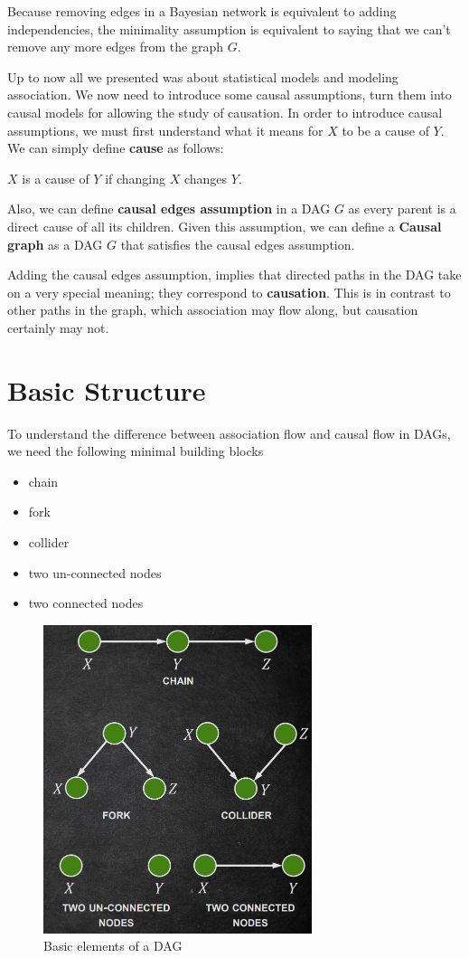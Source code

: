 Because removing edges in a Bayesian network is equivalent to adding
independencies, the minimality assumption is equivalent to saying that we can't
remove any more edges from the graph $G$.

Up to now all we presented was about statistical models and modeling association.
We now need to introduce some causal assumptions, turn them into causal models
for allowing the study of causation. In order to introduce causal assumptions,
we must first understand what it means for $X$ to be a cause of $Y$. We can simply
define \textbf{cause} as follows:
\begin{definition}
    $X$ is a cause of $Y$ if changing $X$ changes $Y$.
\end{definition}

Also, we can define \textbf{causal edges assumption} in a DAG $G$ as every parent
is a direct cause of all its children. Given this assumption, we can define a
\textbf{Causal graph} as a DAG $G$ that satisfies the causal edges assumption.

Adding the causal edges assumption, implies that directed paths in the DAG take
on a very special meaning; they correspond to \textbf{causation}. This is in
contrast to other paths in the graph, which association may flow along, but
causation certainly may not.
\section{Basic Structure}
To understand the difference between association flow and causal flow in DAGs,
we need the following minimal building blocks
\begin{itemize}
    \item chain
    \item fork
    \item collider
    \item two un-connected nodes
    \item two connected nodes
\end{itemize}
\begin{figure}[!ht]
    \centering
    \includegraphics[width=0.7\textwidth]{img/basic_bn.png}
    \caption{Basic elements of a DAG}
\end{figure}


